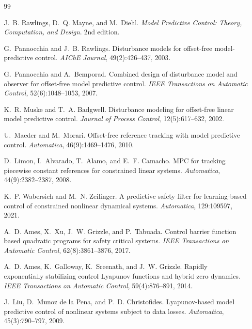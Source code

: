 \documentclass[11pt]{article}
\begin{document}

\begin{thebibliography}{99}

J.~B. Rawlings, D.~Q. Mayne, and M.~Diehl.
\newblock \emph{Model Predictive Control: Theory, Computation, and Design}.
\newblock 2nd edition.

G.~Pannocchia and J.~B. Rawlings.
\newblock Disturbance models for offset-free model-predictive control.
\newblock \emph{AIChE Journal}, 49(2):426--437, 2003.

G.~Pannocchia and A.~Bemporad.
\newblock Combined design of disturbance model and observer for offset-free model predictive control.
\newblock \emph{IEEE Transactions on Automatic Control}, 52(6):1048--1053, 2007.

K.~R. Muske and T.~A. Badgwell.
\newblock Disturbance modeling for offset-free linear model predictive control.
\newblock \emph{Journal of Process Control}, 12(5):617--632, 2002.

U.~Maeder and M.~Morari.
\newblock Offset-free reference tracking with model predictive control.
\newblock \emph{Automatica}, 46(9):1469--1476, 2010.

D.~Limon, I.~Alvarado, T.~Alamo, and E.~F. Camacho.
\newblock MPC for tracking piecewise constant references for constrained linear systems.
\newblock \emph{Automatica}, 44(9):2382--2387, 2008.

K.~P. Wabersich and M.~N. Zeilinger.
\newblock A predictive safety filter for learning-based control of constrained nonlinear dynamical systems.
\newblock \emph{Automatica}, 129:109597, 2021.

A.~D. Ames, X.~Xu, J.~W. Grizzle, and P.~Tabuada.
\newblock Control barrier function based quadratic programs for safety critical systems.
\newblock \emph{IEEE Transactions on Automatic Control}, 62(8):3861--3876, 2017.

A.~D. Ames, K.~Galloway, K.~Sreenath, and J.~W. Grizzle.
\newblock Rapidly exponentially stabilizing control Lyapunov functions and hybrid zero dynamics.
\newblock \emph{IEEE Transactions on Automatic Control}, 59(4):876--891, 2014.

J.~Liu, D.~Munoz de la Pena, and P.~D. Christofides.
\newblock Lyapunov-based model predictive control of nonlinear systems subject to data losses.
\newblock \emph{Automatica}, 45(3):790--797, 2009.

\end{thebibliography}
\end{document}
